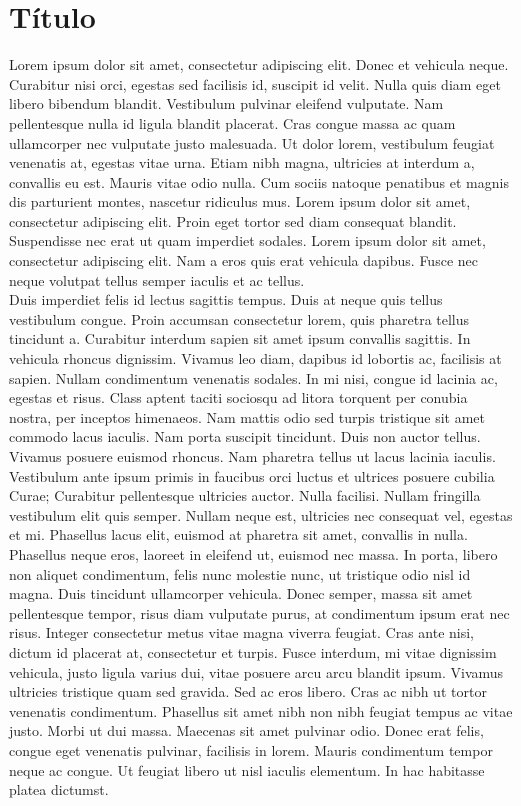 
\chapter{Título}

Lorem ipsum dolor sit amet, consectetur adipiscing elit. Donec et vehicula neque. Curabitur nisi orci, egestas sed facilisis id, suscipit id velit. Nulla quis diam eget libero bibendum blandit. Vestibulum pulvinar eleifend vulputate. Nam pellentesque nulla id ligula blandit placerat. Cras congue massa ac quam ullamcorper nec vulputate justo malesuada. Ut dolor lorem, vestibulum feugiat venenatis at, egestas vitae urna. Etiam nibh magna, ultricies at interdum a, convallis eu est. Mauris vitae odio nulla. Cum sociis natoque penatibus et magnis dis parturient montes, nascetur ridiculus mus. Lorem ipsum dolor sit amet, consectetur adipiscing elit. Proin eget tortor sed diam consequat blandit. Suspendisse nec erat ut quam imperdiet sodales. Lorem ipsum dolor sit amet, consectetur adipiscing elit. Nam a eros quis erat vehicula dapibus. Fusce nec neque volutpat tellus semper iaculis et ac tellus.\\

Duis imperdiet felis id lectus sagittis tempus. Duis at neque quis tellus vestibulum congue. Proin accumsan consectetur lorem, quis pharetra tellus tincidunt a. Curabitur interdum sapien sit amet ipsum convallis sagittis. In vehicula rhoncus dignissim. Vivamus leo diam, dapibus id lobortis ac, facilisis at sapien. Nullam condimentum venenatis sodales. In mi nisi, congue id lacinia ac, egestas et risus. Class aptent taciti sociosqu ad litora torquent per conubia nostra, per inceptos himenaeos. Nam mattis odio sed turpis tristique sit amet commodo lacus iaculis. Nam porta suscipit tincidunt. Duis non auctor tellus. Vivamus posuere euismod rhoncus. Nam pharetra tellus ut lacus lacinia iaculis. Vestibulum ante ipsum primis in faucibus orci luctus et ultrices posuere cubilia Curae; Curabitur pellentesque ultricies auctor. Nulla facilisi. Nullam fringilla vestibulum elit quis semper. Nullam neque est, ultricies nec consequat vel, egestas et mi. Phasellus lacus elit, euismod at pharetra sit amet, convallis in nulla.\\

Phasellus neque eros, laoreet in eleifend ut, euismod nec massa. In porta, libero non aliquet condimentum, felis nunc molestie nunc, ut tristique odio nisl id magna. Duis tincidunt ullamcorper vehicula. Donec semper, massa sit amet pellentesque tempor, risus diam vulputate purus, at condimentum ipsum erat nec risus. Integer consectetur metus vitae magna viverra feugiat. Cras ante nisi, dictum id placerat at, consectetur et turpis. Fusce interdum, mi vitae dignissim vehicula, justo ligula varius dui, vitae posuere arcu arcu blandit ipsum. Vivamus ultricies tristique quam sed gravida. Sed ac eros libero. Cras ac nibh ut tortor venenatis condimentum. Phasellus sit amet nibh non nibh feugiat tempus ac vitae justo. Morbi ut dui massa. Maecenas sit amet pulvinar odio. Donec erat felis, congue eget venenatis pulvinar, facilisis in lorem. Mauris condimentum tempor neque ac congue. Ut feugiat libero ut nisl iaculis elementum. In hac habitasse platea dictumst.\\

